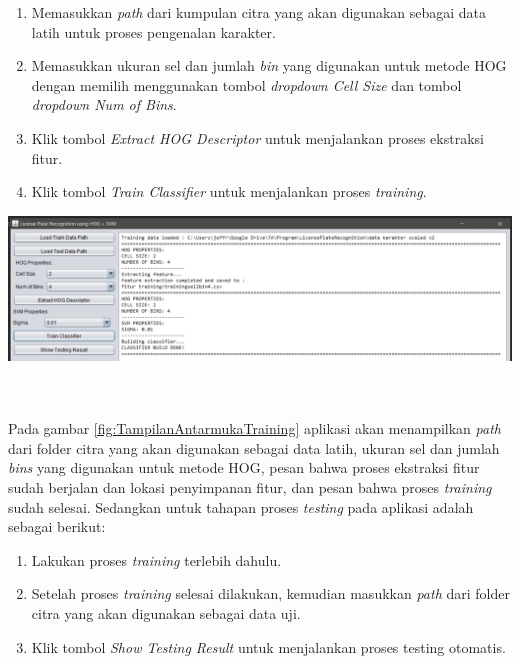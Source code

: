 \begin{enumerate}
\item Memasukkan \textit{path} dari kumpulan citra yang akan digunakan sebagai data latih untuk proses pengenalan karakter.
\item Memasukkan ukuran sel dan jumlah \textit{bin} yang digunakan untuk metode HOG dengan memilih menggunakan tombol \textit{dropdown Cell Size} dan tombol \textit{dropdown Num of Bins}.
\item Klik tombol \textit{Extract HOG Descriptor} untuk menjalankan proses ekstraksi fitur.
\item Klik tombol \textit{Train Classifier} untuk menjalankan proses \textit{training}.
\end{enumerate}
\begin{adjustbox}{width=1\textwidth}
	\noindent\begin{minipage}{\linewidth}
		\centering\includegraphics[width=14cm]{images/TampilanAntarmukaTraining.png}
		\label{fig:TampilanAntarmukaTraining}
	\end{minipage}
\end{adjustbox}\\
\\
\noindent Pada gambar \ref{fig:TampilanAntarmukaTraining} aplikasi akan menampilkan \textit{path} dari folder citra yang akan digunakan sebagai data latih, ukuran sel dan jumlah \textit{bins} yang digunakan untuk metode HOG, pesan bahwa proses ekstraksi fitur sudah berjalan dan lokasi penyimpanan fitur, dan pesan bahwa proses \textit{training} sudah selesai.
\noindent Sedangkan untuk tahapan proses \textit{testing} pada aplikasi adalah sebagai berikut:
\begin{enumerate}
\item Lakukan proses \textit{training} terlebih dahulu.
\item Setelah proses \textit{training} selesai dilakukan, kemudian masukkan \textit{path} dari folder citra yang akan digunakan sebagai data uji.
\item Klik tombol \textit{Show Testing Result} untuk menjalankan proses testing otomatis.
\end{enumerate}
